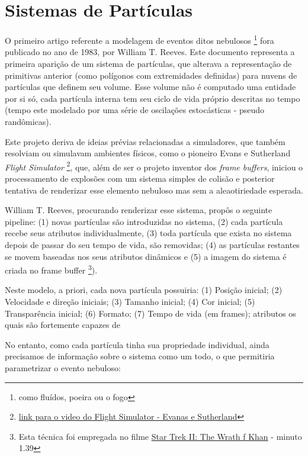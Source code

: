 \section{Sistemas de Partículas}
\label{sec:sis-part}

O primeiro artigo referente a modelagem de eventos ditos nebulosos \footnote{como fluídos, poeira ou o fogo} fora publicado no ano de 1983, por William T. Reeves\cite{reeves1983}. Este documento representa a primeira aparição de um sistema de partículas, que alterava a representação de primitivas anterior (como polígonos com extremidades definidas) para nuvens de partículas que definem seu volume. Esse volume não é computado uma entidade por si só, cada partícula interna tem seu ciclo de vida próprio descritas no tempo (tempo este modelado por uma série de oscilações estocásticas - pseudo randômicas). 

Este projeto deriva de ideias prévias relacionadas a simuladores, que também resolviam ou simulavam ambientes físicos, como o pioneiro Evans e Sutherland \textit{Flight Simulator} \footnote{\href{https://www.youtube.com/watch?v=6W-qb_jHRhA}{link para o video do Flight Simulator - Evanas e Sutherland}}, que, além de ser o projeto inventor dos \textit{frame buffers}, iniciou o processamento de explosões com um sistema simples de colisão e posterior tentativa de renderizar esse elemento nebuloso mas sem a aleaotiriedade esperada.

William T. Reeves, procurando renderizar esse sistema, propôs o seguinte pipeline: (1) novas partículas são introduzidas no sistema, (2) cada partícula recebe seus atributos individualmente, (3) toda partícula que exista no sistema depois de passar do seu tempo de vida, são removidas; (4) as partículas restantes se movem baseadas nos seus atributos dinâmicos e (5) a imagem do sistema é criada no frame buffer \footnote{Esta técnica foi empregada no filme \href{https://www.youtube.com/watch?v=x8X44NRltMM}{Star Trek II: The Wrath f Khan} - minuto 1.39 }). 

Neste modelo, a priori, cada nova partícula possuiria: (1) Posição inicial; (2) Velocidade e direção iniciais; (3) Tamanho inicial; (4) Cor inicial; (5) Transparência inicial; (6) Formato; (7) Tempo de vida (em frames); atributos os quais são fortemente capazes de 

No entanto, como cada partícula tinha sua propriedade individual, ainda precisamos de informação sobre o sistema como um todo, o que permitiria parametrizar o evento nebuloso: 

